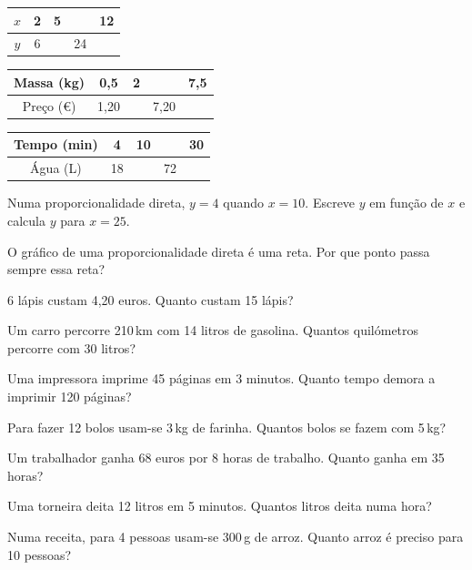\documentclass[12pt]{article}
\begin{document}
\begin{exercicios}
  \item \begin{tabular}[c]{|c|c|c|c|c|}\hline
    $x$ & 2 & 5 & \phantom{00} & 12 \\\hline
    $y$ & 6 & \phantom{00} & 24 & \phantom{00} \\\hline
  \end{tabular}
  \item \begin{tabular}[c]{|c|c|c|c|c|}\hline
    Massa (kg) & 0,5 & 2 & \phantom{00} & 7,5 \\\hline
    Preço (€) & 1,20 & \phantom{000} & 7,20 & \phantom{000} \\\hline
  \end{tabular}
  \item \begin{tabular}[c]{|c|c|c|c|c|}\hline
    Tempo (min) & 4 & 10 & \phantom{00} & 30 \\\hline
    Água (L) & 18 & \phantom{00} & 72 & \phantom{00} \\\hline
  \end{tabular}
  \item Numa proporcionalidade direta, $y = 4$ quando $x = 10$. Escreve $y$ em função de $x$ e calcula $y$ para $x = 25$.
  \item O gráfico de uma proporcionalidade direta é uma reta. Por que ponto passa sempre essa reta?
\end{exercicios}

\begin{exercicios}
  \item 6 lápis custam 4,20 euros. Quanto custam 15 lápis?
  \item Um carro percorre 210\,km com 14 litros de gasolina. Quantos quilómetros percorre com 30 litros?
  \item Uma impressora imprime 45 páginas em 3 minutos. Quanto tempo demora a imprimir 120 páginas?
  \item Para fazer 12 bolos usam-se 3\,kg de farinha. Quantos bolos se fazem com 5\,kg?
  \item Um trabalhador ganha 68 euros por 8 horas de trabalho. Quanto ganha em 35 horas?
  \item Uma torneira deita 12 litros em 5 minutos. Quantos litros deita numa hora?
  \item Numa receita, para 4 pessoas usam-se 300\,g de arroz. Quanto arroz é preciso para 10 pessoas?
\end{exercicios}
\end{document}
